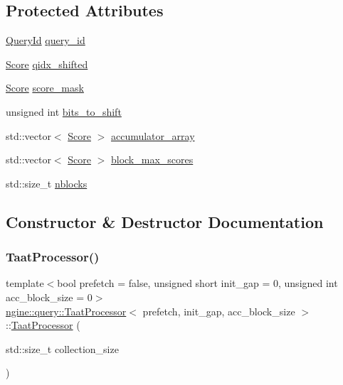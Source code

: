 \subsection*{Protected Attributes}
\begin{DoxyCompactItemize}
\item 
\hyperlink{namespacengine_1_1query_a3deddbc36af48dca2072f880a752b001}{Query\+Id} \hyperlink{classngine_1_1query_1_1TaatProcessor_a40071c737df3c2ef19f7d05dcfaeeabf}{query\+\_\+id}
\item 
\hyperlink{structngine_1_1Score}{Score} \hyperlink{classngine_1_1query_1_1TaatProcessor_aa826aadc136dfd788b88dcaa25aeecae}{qidx\+\_\+shifted}
\item 
\hyperlink{structngine_1_1Score}{Score} \hyperlink{classngine_1_1query_1_1TaatProcessor_a3112a7c3c9039dca39892fb914fcfb80}{score\+\_\+mask}
\item 
unsigned int \hyperlink{classngine_1_1query_1_1TaatProcessor_af703513e15abe11e9f20f169d242f98d}{bits\+\_\+to\+\_\+shift}
\item 
std\+::vector$<$ \hyperlink{structngine_1_1Score}{Score} $>$ \hyperlink{classngine_1_1query_1_1TaatProcessor_aea8aedfefd69234d3959071613693501}{accumulator\+\_\+array}
\item 
std\+::vector$<$ \hyperlink{structngine_1_1Score}{Score} $>$ \hyperlink{classngine_1_1query_1_1TaatProcessor_a5c2eed7057ca7331cda7dcf7207c7d40}{block\+\_\+max\+\_\+scores}
\item 
std\+::size\+\_\+t \hyperlink{classngine_1_1query_1_1TaatProcessor_aa37c683d30eea3d01a629841923d8407}{nblocks}
\end{DoxyCompactItemize}


\subsection{Constructor \& Destructor Documentation}
\mbox{\label{classngine_1_1query_1_1TaatProcessor_a0bf77a30ee770c13ba6c3be542a582fa}} 
\subsubsection{\texorpdfstring{Taat\+Processor()}{TaatProcessor()}}
{\footnotesize\ttfamily template$<$bool prefetch = false, unsigned short init\+\_\+gap = 0, unsigned int acc\+\_\+block\+\_\+size = 0$>$ \\
\hyperlink{classngine_1_1query_1_1TaatProcessor}{ngine\+::query\+::\+Taat\+Processor}$<$ prefetch, init\+\_\+gap, acc\+\_\+block\+\_\+size $>$\+::\hyperlink{classngine_1_1query_1_1TaatProcessor}{Taat\+Processor} (\begin{DoxyParamCaption}\item[{std\+::size\+\_\+t}]{collection\+\_\+size }\end{DoxyParamCaption})\hspace{0.3cm}{\ttfamily [inline]}}



